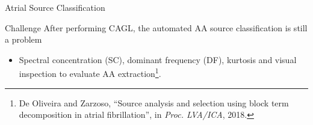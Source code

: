 \documentclass{beamer}
\begin{document}
	\begin{frame}{Atrial Source Classification}
			
			\begin{block}{Challenge}
				After performing CAGL, the automated AA source classification is still a problem
			\end{block}
			
			\begin{itemize}
				\item Spectral concentration (SC), dominant frequency (DF), kurtosis and visual inspection to evaluate AA extraction\footnote{De Oliveira and Zarzoso, ``Source analysis and selection using block term decomposition in atrial fibrillation'', in \textit{Proc. LVA/ICA}, 2018.}.
			\end{itemize}
	\end{frame}	
\end{document}
